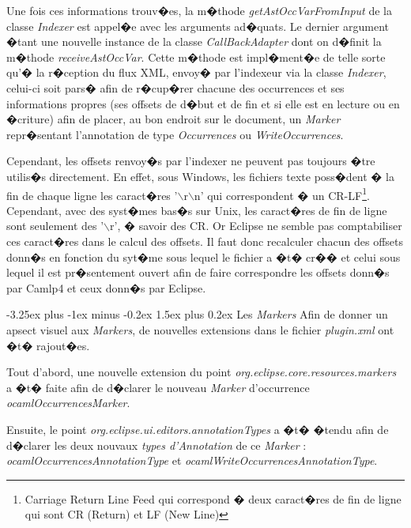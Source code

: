 \documentclass[a4paper,11pt,titlepage]{article}
\makeatletter
\renewcommand{\paragraph}{\@startsection{paragraph}{4}{0ex}%
   {-3.25ex plus -1ex minus -0.2ex}%
   {1.5ex plus 0.2ex}%
   {\normalfont\normalsize\bfseries}}
\makeatother
\begin{document}
Une fois ces informations trouv�es, la m�thode \textit{getAstOccVarFromInput} de la classe \textit{Indexer} est appel�e avec les arguments ad�quats. Le dernier argument �tant une nouvelle instance de la classe \textit{CallBackAdapter} dont on d�finit la m�thode \textit{receiveAstOccVar}. Cette m�thode est impl�ment�e de telle sorte qu'� la r�ception du flux XML, envoy� par l'indexeur via la classe \textit{Indexer}, celui-ci soit pars� afin de r�cup�rer chacune des occurrences et ses informations propres (ses offsets de d�but et de fin et si elle est en lecture ou en �criture) afin de placer, au bon endroit sur le document, un \textit{Marker} repr�sentant l'annotation de type \textit{Occurrences} ou  \textit{WriteOccurrences}.

Cependant, les offsets renvoy�s par l'indexer ne peuvent pas toujours �tre utilis�s directement. En effet, sous Windows, les fichiers texte poss�dent � la fin de chaque ligne les caract�res '$\backslash$r$\backslash$n' qui correspondent � un CR-LF\footnote{Carriage Return Line Feed qui correspond � deux caract�res de fin de ligne qui sont CR (Return) et LF (New Line)}. Cependant, avec des syst�mes bas�s sur Unix, les caract�res de fin de ligne sont seulement des '$\backslash$r', � savoir des CR.  
Or Eclipse ne semble pas comptabiliser ces caract�res dans le calcul des offsets. Il faut donc recalculer chacun des offsets donn�s en fonction du syt�me sous lequel le fichier a �t� cr�� et celui sous lequel il est pr�sentement ouvert afin de faire correspondre les offsets donn�s par Camlp4 et ceux donn�s par Eclipse.

\paragraph{Les \textit{Markers}} Afin de donner un apsect visuel aux \textit{Markers}, de nouvelles extensions dans le fichier \textit{plugin.xml} ont �t� rajout�es. 

Tout d'abord,  une nouvelle extension du point \textit{org.eclipse.core.resources.markers} a �t� faite afin de d�clarer le nouveau \textit{Marker} d'occurrence \textit{ocamlOccurrencesMarker}. 

Ensuite, le point \textit{org.eclipse.ui.editors.annotationTypes} a �t� �tendu afin de d�clarer les deux nouvaux \textit{types d'Annotation} de ce \textit{Marker} : \textit{ocamlOccurrencesAnnotationType} et \textit{ocamlWriteOccurrencesAnnotationType}. 
\end{document}
